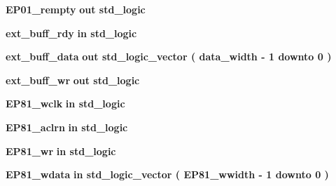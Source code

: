 \begin{DoxyCompactItemize}
\item 
{\bf E\+P01\+\_\+rempty}  {\bfseries {\bfseries \textcolor{keywordflow}{out}\textcolor{vhdlchar}{ }}} {\bfseries \textcolor{comment}{std\+\_\+logic}\textcolor{vhdlchar}{ }} 
\item 
{\bf ext\+\_\+buff\+\_\+rdy}  {\bfseries {\bfseries \textcolor{keywordflow}{in}\textcolor{vhdlchar}{ }}} {\bfseries \textcolor{comment}{std\+\_\+logic}\textcolor{vhdlchar}{ }} 
\item 
{\bf ext\+\_\+buff\+\_\+data}  {\bfseries {\bfseries \textcolor{keywordflow}{out}\textcolor{vhdlchar}{ }}} {\bfseries \textcolor{comment}{std\+\_\+logic\+\_\+vector}\textcolor{vhdlchar}{ }\textcolor{vhdlchar}{(}\textcolor{vhdlchar}{ }\textcolor{vhdlchar}{ }\textcolor{vhdlchar}{ }\textcolor{vhdlchar}{ }{\bfseries {\bf data\+\_\+width}} \textcolor{vhdlchar}{-\/}\textcolor{vhdlchar}{ } \textcolor{vhdldigit}{1} \textcolor{vhdlchar}{ }\textcolor{keywordflow}{downto}\textcolor{vhdlchar}{ }\textcolor{vhdlchar}{ } \textcolor{vhdldigit}{0} \textcolor{vhdlchar}{ }\textcolor{vhdlchar}{)}\textcolor{vhdlchar}{ }} 
\item 
{\bf ext\+\_\+buff\+\_\+wr}  {\bfseries {\bfseries \textcolor{keywordflow}{out}\textcolor{vhdlchar}{ }}} {\bfseries \textcolor{comment}{std\+\_\+logic}\textcolor{vhdlchar}{ }} 
\item 
{\bf E\+P81\+\_\+wclk}  {\bfseries {\bfseries \textcolor{keywordflow}{in}\textcolor{vhdlchar}{ }}} {\bfseries \textcolor{comment}{std\+\_\+logic}\textcolor{vhdlchar}{ }} 
\item 
{\bf E\+P81\+\_\+aclrn}  {\bfseries {\bfseries \textcolor{keywordflow}{in}\textcolor{vhdlchar}{ }}} {\bfseries \textcolor{comment}{std\+\_\+logic}\textcolor{vhdlchar}{ }} 
\item 
{\bf E\+P81\+\_\+wr}  {\bfseries {\bfseries \textcolor{keywordflow}{in}\textcolor{vhdlchar}{ }}} {\bfseries \textcolor{comment}{std\+\_\+logic}\textcolor{vhdlchar}{ }} 
\item 
{\bf E\+P81\+\_\+wdata}  {\bfseries {\bfseries \textcolor{keywordflow}{in}\textcolor{vhdlchar}{ }}} {\bfseries \textcolor{comment}{std\+\_\+logic\+\_\+vector}\textcolor{vhdlchar}{ }\textcolor{vhdlchar}{(}\textcolor{vhdlchar}{ }\textcolor{vhdlchar}{ }\textcolor{vhdlchar}{ }\textcolor{vhdlchar}{ }{\bfseries {\bf E\+P81\+\_\+wwidth}} \textcolor{vhdlchar}{-\/}\textcolor{vhdlchar}{ } \textcolor{vhdldigit}{1} \textcolor{vhdlchar}{ }\textcolor{keywordflow}{downto}\textcolor{vhdlchar}{ }\textcolor{vhdlchar}{ } \textcolor{vhdldigit}{0} \textcolor{vhdlchar}{ }\textcolor{vhdlchar}{)}\textcolor{vhdlchar}{ }} 

\end{DoxyCompactItemize}
